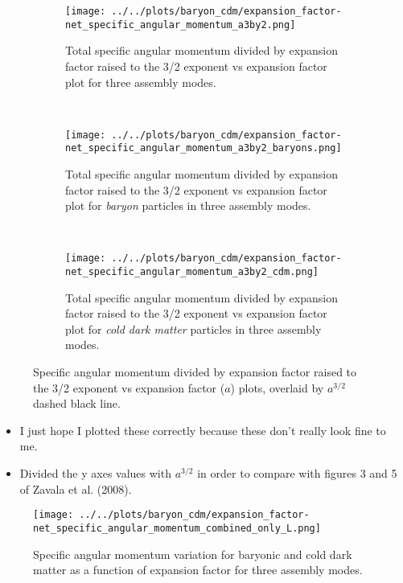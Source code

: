 \documentclass{article}
\begin{document}
	\begin{figure} [h!]
		\centering
		\begin{subfigure} {\columnwidth}
				\centering 
				\texttt{[image: ../../plots/baryon\_cdm/expansion\_factor-net\_specific\_angular\_momentum\_a3by2.png]}
				\caption{Total specific angular momentum divided by expansion factor raised to the 3/2 exponent vs expansion factor plot for three assembly modes.}
		\end{subfigure} \\
			\vspace{1cm}
		\begin{subfigure} {\columnwidth}
				\centering 
				\texttt{[image: ../../plots/baryon\_cdm/expansion\_factor-net\_specific\_angular\_momentum\_a3by2\_baryons.png]}
				\caption{Total specific angular momentum divided by expansion factor raised to the 3/2 exponent vs expansion factor plot for \emph{baryon} particles in three assembly modes.}
		\end{subfigure} \\
			\vspace{1cm}
		\begin{subfigure} {\columnwidth}
				\centering 
				\texttt{[image: ../../plots/baryon\_cdm/expansion\_factor-net\_specific\_angular\_momentum\_a3by2\_cdm.png]}
				\caption{Total specific angular momentum divided by expansion factor raised to the 3/2 exponent vs expansion factor plot for \emph{cold dark matter} particles in three assembly modes.}
		\end{subfigure}
		\caption{Specific angular momentum divided by expansion factor raised to the 3/2 exponent vs expansion factor (\(a\)) plots, overlaid by \(a^{3/2}\) dashed black line.}
	\end{figure}

	\begin{itemize}
		\item I just hope I plotted these correctly because these don't really look fine to me. 
		\item Divided the y axes values with \(a^{3/2}\) in order to compare with figures 3 and 5 of Zavala et al. (2008).
	\end{itemize}

	\clearpage 
	\begin{figure} 
		\centering 
		\texttt{[image: ../../plots/baryon\_cdm/expansion\_factor-net\_specific\_angular\_momentum\_combined\_only\_L.png]}
		\caption{Specific angular momentum variation for baryonic and cold dark matter as a function of expansion factor for three assembly modes.}
	\end{figure}
\end{document}
